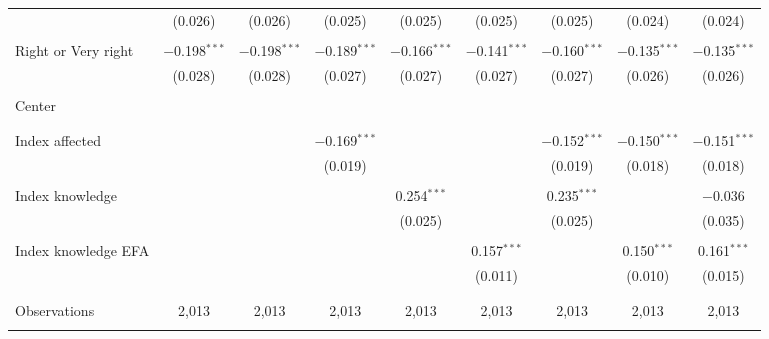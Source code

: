 \begin{tabular}{@{\extracolsep{5pt}}lcccccccc}
  & (0.026) & (0.026) & (0.025) & (0.025) & (0.025) & (0.025) & (0.024) & (0.024) \\ 
  & & & & & & & & \\ 
 Right or Very right & $-$0.198$^{***}$ & $-$0.198$^{***}$ & $-$0.189$^{***}$ & $-$0.166$^{***}$ & $-$0.141$^{***}$ & $-$0.160$^{***}$ & $-$0.135$^{***}$ & $-$0.135$^{***}$ \\ 
  & (0.028) & (0.028) & (0.027) & (0.027) & (0.027) & (0.027) & (0.026) & (0.026) \\ 
  & & & & & & & & \\ 
 Center &  &  &  &  &  &  &  &  \\ 
  &  &  &  &  &  &  &  &  \\ 
  & & & & & & & & \\ 
 Index affected &  &  & $-$0.169$^{***}$ &  &  & $-$0.152$^{***}$ & $-$0.150$^{***}$ & $-$0.151$^{***}$ \\ 
  &  &  & (0.019) &  &  & (0.019) & (0.018) & (0.018) \\ 
  & & & & & & & & \\ 
 Index knowledge &  &  &  & 0.254$^{***}$ &  & 0.235$^{***}$ &  & $-$0.036 \\ 
  &  &  &  & (0.025) &  & (0.025) &  & (0.035) \\ 
  & & & & & & & & \\ 
 Index knowledge EFA &  &  &  &  & 0.157$^{***}$ &  & 0.150$^{***}$ & 0.161$^{***}$ \\ 
  &  &  &  &  & (0.011) &  & (0.010) & (0.015) \\ 
  & & & & & & & & \\ 
\hline \\[-1.8ex] 

Observations & 2,013 & 2,013 & 2,013 & 2,013 & 2,013 & 2,013 & 2,013 & 2,013 \\ 
\hline 
\hline \\[-1.8ex] 
\end{tabular} 